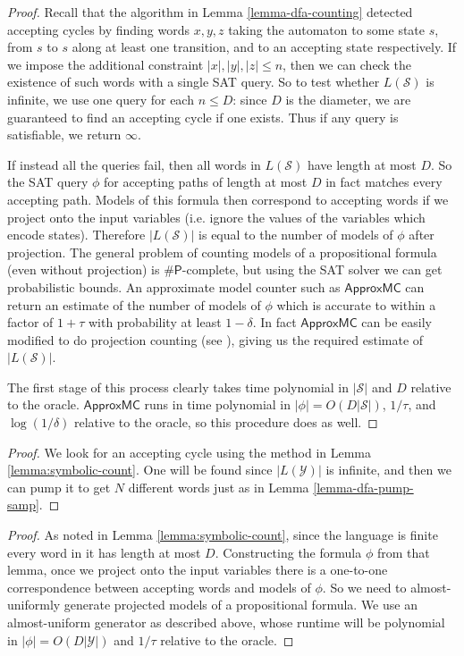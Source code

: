 \documentclass[a4paper,USenglish,numberwithinsect]{lipics}
\theoremstyle{plain}
\theoremstyle{definition}
\newcommand{\sharpP}{\ensuremath{\mathsf{\# P}}}
\newcommand{\ApproxMC}{\ensuremath{\mathsf{ApproxMC}}}
\begin{document}
\lemmaSymbolicCount*
\begin{proof}
Recall that the algorithm in Lemma \ref{lemma-dfa-counting} detected
accepting cycles by finding words $x,y,z$ taking the automaton to some
state $s$, from $s$ to $s$ along at least one transition, and to an
accepting state respectively. If we impose the additional constraint
$|x|, |y|, |z| \le n$, then we can check the existence of such words
with a single SAT query. So to test whether $L(\mathcal{S})$ is
infinite, we use one query for each $n \le D$: since $D$ is the
diameter, we are guaranteed to find an accepting cycle if one
exists. Thus if any query is satisfiable, we return $\infty$. 

If instead all the queries fail, then all words in $L(\mathcal{S})$
have length at most $D$. So the SAT query $\phi$ for accepting paths
of length at most $D$ in fact matches every accepting path. Models of
this formula then correspond to accepting words if we project onto the
input variables (i.e. ignore the values of the variables which encode
states). Therefore $|L(\mathcal{S})|$ is equal to the number of models
of $\phi$ after projection. The general problem of counting models of
a propositional formula (even without projection) is \sharpP-complete,
but using the SAT solver we can get probabilistic bounds. An
approximate model counter such as {\ApproxMC} \cite{approxmc} can
return an estimate of the number of models of $\phi$ which is accurate
to within a factor of $1 + \tau$ with probability at least $1 -
\delta$. In fact {\ApproxMC} can be easily modified to do projection
counting (see \cite{unigen}), giving us the required estimate of
$|L(\mathcal{S})|$. 

The first stage of this process clearly takes time polynomial in $|\mathcal{S}|$ and $D$ relative to the oracle. {\ApproxMC} runs in time polynomial in $|\phi| = O(D |\mathcal{S}|)$, $1/\tau$, and $\log(1/\delta)$ relative to the oracle, so this procedure does as well.
\end{proof}

\lemmaSymbPumpSamp*
\begin{proof}
We look for an accepting cycle using the method in Lemma \ref{lemma:symbolic-count}. One will be found since $|L(\mathcal{Y})|$ is infinite, and then we can pump it to get $N$ different words just as in Lemma \ref{lemma-dfa-pump-samp}.
\end{proof}

\lemmaSymbUnifSamp*
\begin{proof}
As noted in Lemma \ref{lemma:symbolic-count}, since the language is finite every word in it has length at most $D$. Constructing the formula $\phi$ from that lemma, once we project onto the input variables there is a one-to-one correspondence between accepting words and models of $\phi$. So we need to almost-uniformly generate projected models of a propositional formula. We use an almost-uniform generator as described above, whose runtime will be polynomial in $|\phi| = O(D|\mathcal{Y}|)$ and $1/\tau$ relative to the oracle.
\end{proof}
\end{document}
